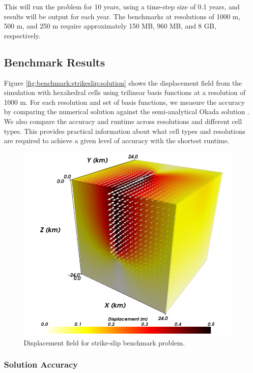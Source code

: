 This will run the problem for 10 years, using a time-step size of 0.1
years, and results will be output for each year. The benchmarks at
resolutions of 1000 m, 500 m, and 250 m require approximately 150 MB,
960 MB, and 8 GB, respectively.


\subsection{Benchmark Results}

Figure \vref{fig:benchmark:strikeslip:solution} shows the displacement
field from the simulation with hexahedral cells using trilinear basis
functions at a resolution of 1000 m. For each resolution and set of
basis functions, we measure the accuracy by comparing the numerical
solution against the semi-analytical Okada solution \cite{Okada:1992}.
We also compare the accuracy and runtime across resolutions and different
cell types. This provides practical information about what cell types
and resolutions are required to achieve a given level of accuracy
with the shortest runtime.

\begin{figure}[htbp]
  \includegraphics[scale=0.33]{benchmarks/figs/strikeslip_soln}
  \caption{Displacement field for strike-slip benchmark problem.}
  \label{fig:benchmark:strikeslip:solution}
\end{figure}

\subsubsection{Solution Accuracy}

